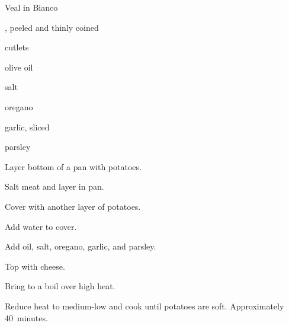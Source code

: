 \begin{recipe}{Veal in Bianco}{}{}

\begin{ingredients}
\item {}, peeled and thinly coined
\item {} cutlets
\item olive oil
\item salt
\item oregano
\item garlic, sliced
\item parsley
\item {}
\end{ingredients}

\begin{directions}
\item Layer bottom of a pan with potatoes.
\item Salt meat and layer in pan.
\item Cover with another layer of potatoes.
\item Add water to cover.
\item Add oil, salt, oregano, garlic, and parsley.
\item Top with cheese.
\item Bring to a boil over high heat.
\item Reduce heat to medium-low and cook until potatoes are soft. Approximately 40~minutes.
\end{directions}

\hint{}
\end{recipe}
